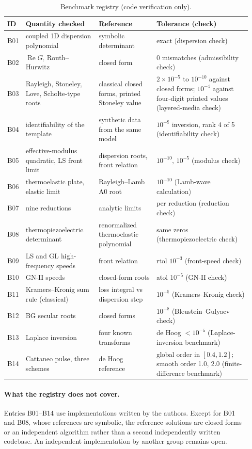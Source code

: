 \begin{table}[H]\centering\small
\caption{Benchmark registry (code verification only).}\label{tab:registry}
\begin{tabularx}{\textwidth}{@{}l p{3.1cm} p{3.5cm} X@{}}\toprule
ID & Quantity checked & Reference & Tolerance (check)\\\midrule
B01 & coupled 1D dispersion polynomial & symbolic determinant & exact (dispersion check)\\
B02 & $\operatorname{Re}G$, Routh--Hurwitz & closed form & 0 mismatches (admissibility check)\\
B03 & Rayleigh, Stoneley, Love, Scholte-type roots & classical closed forms, printed Stoneley value & $2\times10^{-5}$ to $10^{-10}$ against closed forms; $10^{-4}$ against four-digit printed values (layered-media check)\\
B04 & identifiability of the template & synthetic data from the same model & $10^{-9}$ inversion, rank 4 of 5 (identifiability check)\\
B05 & effective-modulus quadratic, LS front limit & dispersion roots, front relation & $10^{-10}$, $10^{-5}$ (modulus check)\\
B06 & thermoelastic plate, elastic limit & Rayleigh--Lamb A0 root & $10^{-10}$ (Lamb-wave calculation)\\
B07 & nine reductions & analytic limits & per reduction (reduction check)\\
B08 & thermopiezoelectric determinant & renormalized thermoelastic polynomial & same zeros (thermopiezoelectric check)\\
B09 & LS and GL high-frequency speeds & front relation & rtol $10^{-3}$ (front-speed check)\\
B10 & GN-II speeds & closed-form roots & atol $10^{-5}$ (GN-II check)\\
B11 & Kramers--Kronig sum rule (classical) & loss integral vs dispersion step & $10^{-5}$ (Kramers--Kronig check)\\
B12 & BG secular roots & closed forms & $10^{-8}$ (Bleustein--Gulyaev check)\\
B13 & Laplace inversion & four known transforms & de Hoog $<10^{-5}$ (Laplace-inversion benchmark)\\
B14 & Cattaneo pulse, three schemes & de Hoog reference & global order in $[0.4,1.2]$; smooth order 1.0, 2.0 (finite-difference benchmark)\\
\bottomrule\end{tabularx}
\end{table}

\paragraph{What the registry does not cover.} Entries B01--B14 use implementations written by the authors. Except for B01 and B08, whose references are symbolic, the reference solutions are closed forms or an independent algorithm rather than a second independently written codebase. An independent implementation by another group remains open.
